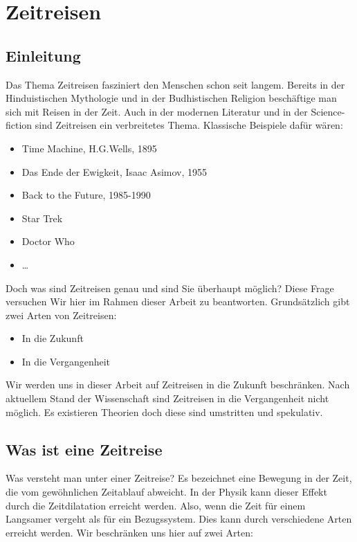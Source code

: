 \chapter{Zeitreisen\label{chapter:thema}}
\begin{refsection}

\section{Einleitung}
Das Thema Zeitreisen fasziniert den Menschen schon seit langem. Bereits in der Hinduistischen Mythologie und in der Budhistischen Religion besch\"aftige man sich mit Reisen in der Zeit. Auch in der modernen Literatur und in der Science-fiction sind Zeitreisen ein verbreitetes Thema. Klassische Beispiele daf\"ur w\"aren: 

\begin{itemize}
    \item Time Machine, H.G.Wells, 1895 
    \item Das Ende der Ewigkeit, Isaac Asimov, 1955
    \item Back to the Future, 1985-1990
    \item Star Trek
    \item Doctor Who
    \item \ldots
\end{itemize}

Doch was sind Zeitreisen genau und sind Sie \"uberhaupt m\"oglich? Diese Frage versuchen Wir hier im Rahmen dieser Arbeit zu beantworten.
Grunds\"atzlich gibt zwei Arten von Zeitreisen:

\begin{itemize}
    \item In die Zukunft
    \item In die Vergangenheit
\end{itemize}

Wir werden uns in dieser Arbeit auf Zeitreisen in die Zukunft beschr\"anken. Nach aktuellem Stand der Wissenschaft sind Zeitreisen in die Vergangenheit nicht m\"oglich. Es existieren Theorien doch diese sind umstritten und spekulativ.

\section{Was ist eine Zeitreise}
Was versteht man unter einer Zeitreise? Es bezeichnet eine Bewegung in der Zeit, die vom gew\"ohnlichen Zeitablauf abweicht. In der Physik kann dieser Effekt durch die Zeitdilatation erreicht werden. Also, wenn die Zeit f\"ur einem Langsamer vergeht als f\"ur ein Bezugssystem. Dies kann durch verschiedene Arten erreicht werden. Wir beschr\"anken uns hier auf zwei Arten:


\end{refsection}
